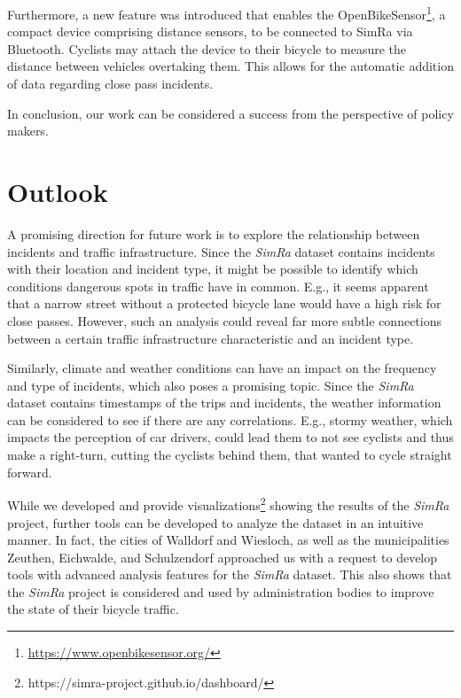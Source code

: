 Furthermore, a new feature was introduced that enables the OpenBikeSensor\footnote{\url{https://www.openbikesensor.org/}}, a compact device comprising distance sensors, to be connected to SimRa via Bluetooth.
Cyclists may attach the device to their bicycle to measure the distance between vehicles overtaking them. This allows for the automatic addition of data regarding close pass incidents.

In conclusion, our work can be considered a success from the perspective of policy makers.

\section*{Outlook}
\label{sec:outlook}
A promising direction for future work is to explore the relationship between incidents and traffic infrastructure.
Since the \textit{SimRa} dataset contains incidents with their location and incident type, it might be possible to identify which conditions dangerous spots in traffic have in common.
E.g., it seems apparent that a narrow street without a protected bicycle lane would have a high risk for close passes.
However, such an analysis could reveal far more subtle connections between a certain traffic infrastructure characteristic and an incident type.

Similarly, climate and weather conditions can have an impact on the frequency and type of incidents, which also poses a promising topic.
Since the \textit{SimRa} dataset contains timestamps of the trips and incidents, the weather information can be considered to see if there are any correlations.
E.g., stormy weather, which impacts the perception of car drivers, could lead them to not see cyclists and thus make a right-turn, cutting the cyclists behind them, that wanted to cycle straight forward.

While we developed and provide visualizations\footnote{https://simra-project.github.io/dashboard/} showing the results of the \textit{SimRa} project, further tools can be developed to analyze the dataset in an intuitive manner.
In fact, the cities of Walldorf and Wiesloch, as well as the municipalities Zeuthen, Eichwalde, and Schulzendorf approached us with a request to develop tools with advanced analysis features for the \textit{SimRa} dataset.
This also shows that the \textit{SimRa} project is considered and used by administration bodies to improve the state of their bicycle traffic.
 